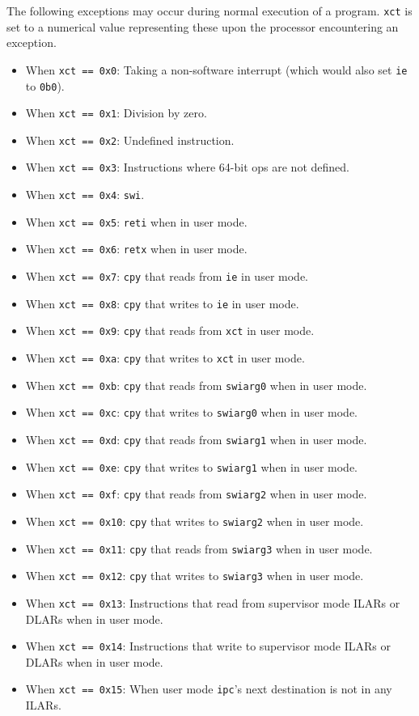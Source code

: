 \documentclass{article}
\begin{document}
	The following exceptions may occur during normal execution of a
	program. \texttt{xct} is set to a numerical value representing these
	upon the processor encountering an exception. 

	\begin{itemize}
	\item When \texttt{xct == 0x0}:
		Taking a non-software interrupt (which would also set \texttt{ie}
		to \texttt{0b0}).
	\item When \texttt{xct == 0x1}: Division by zero.
	\item When \texttt{xct == 0x2}: Undefined instruction.
	\item When \texttt{xct == 0x3}:
		Instructions where 64-bit ops are not defined.
	\item When \texttt{xct == 0x4}: \texttt{swi}.
	\item When \texttt{xct == 0x5}: \texttt{reti} when in user mode.
	\item When \texttt{xct == 0x6}: \texttt{retx} when in user mode.

	\item When \texttt{xct == 0x7}:
		\texttt{cpy} that reads from \texttt{ie} in user mode.
	\item When \texttt{xct == 0x8}:
		\texttt{cpy} that writes to \texttt{ie} in user mode.
	\item When \texttt{xct == 0x9}:
		\texttt{cpy} that reads from \texttt{xct} in user mode.
	\item When \texttt{xct == 0xa}:
		\texttt{cpy} that writes to \texttt{xct} in user mode.

	\item When \texttt{xct == 0xb}:
		\texttt{cpy} that reads from \texttt{swiarg0} when in user mode.
	\item When \texttt{xct == 0xc}:
		\texttt{cpy} that writes to \texttt{swiarg0} when in user mode.
	\item When \texttt{xct == 0xd}:
		\texttt{cpy} that reads from \texttt{swiarg1} when in user mode.
	\item When \texttt{xct == 0xe}:
		\texttt{cpy} that writes to \texttt{swiarg1} when in user mode.

	\item When \texttt{xct == 0xf}:
		\texttt{cpy} that reads from \texttt{swiarg2} when in user mode.
	\item When \texttt{xct == 0x10}:
		\texttt{cpy} that writes to \texttt{swiarg2} when in user mode.
	\item When \texttt{xct == 0x11}:
		\texttt{cpy} that reads from \texttt{swiarg3} when in user mode.
	\item When \texttt{xct == 0x12}:
		\texttt{cpy} that writes to \texttt{swiarg3} when in user mode.

	\item When \texttt{xct == 0x13}:
		Instructions that read from supervisor mode ILARs or DLARs when in
		user mode.
	\item When \texttt{xct == 0x14}:
		Instructions that write to supervisor mode ILARs or DLARs when in
		user mode.
	\item When \texttt{xct == 0x15}:
		When user mode \texttt{ipc}'s next destination is not in any ILARs.
	\end{itemize}
	\newpage
\end{document}
